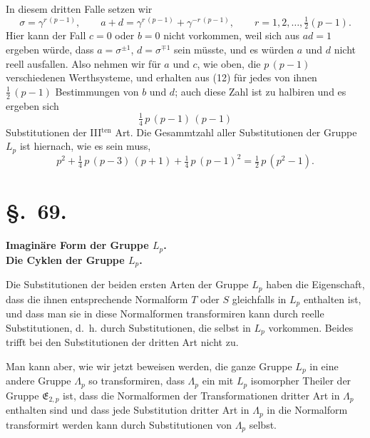 \documentclass[12pt,a4paper]{article}
\newcommand{\sect}[1]{\section*{{\S.~#1.}}\addcontentsline{toc}{section}{\S.~#1}}
\begin{document}
In diesem dritten Falle setzen wir
\begin{equation}\label{eq:68.12}
\tag{12}
\sigma = \gamma^{r\,(p-1)},\qquad
a + d = \gamma^{r\,(p-1)} + \gamma^{-r\,(p-1)},\qquad
r = 1, 2, \ldots, \tfrac{1}{2}(p-1).
\end{equation}
Hier kann der Fall $c = 0$ oder $b = 0$ nicht vorkommen, weil sich aus $ad = 1$ ergeben würde, dass $a = \sigma^{\pm 1}$, $d = \sigma^{\mp 1}$ sein müsste, und es würden $a$ und $d$ nicht reell ausfallen. Also nehmen wir für $a$ und $c$, wie oben, die $p\,(p-1)$ verschiedenen Werthsysteme, und erhalten aus (12) für jedes von ihnen $\frac{1}{2}\,(p-1)$ Bestimmungen von $b$ und $d$; auch diese Zahl ist zu halbiren und es ergeben sich
\[
\tfrac{1}{4}\,p\,(p-1)\,(p-1)
\]
Substitutionen der III$^{\text{ten}}$ Art. Die Gesammtzahl aller Substitutionen der Gruppe $L_{p}$ ist hiernach, wie es sein muss,
\[
p^{2} + \tfrac{1}{4}\,p\,(p-3)\,(p+1) + \tfrac{1}{4}\,p\,(p-1)^{2}
= \tfrac{1}{2}\,p\,(p^{2} - 1).
\]



\newpage
\sect{69}
\begin{center}
\textbf{Imaginäre Form der Gruppe $L_{p}$.\\Die Cyklen der Gruppe $L_{p}$.}
\end{center}
\label{sec:69}

Die Substitutionen der beiden ersten Arten der Gruppe $L_{p}$ haben die Eigenschaft, dass die ihnen entsprechende Normalform $T$ oder $S$ gleichfalls in $L_{p}$ enthalten ist, und dass man sie in diese Normalformen transformiren kann durch reelle Substitutionen, d.~h. durch Substitutionen, die selbst in $L_{p}$ vorkommen. Beides trifft bei den Substitutionen der dritten Art nicht zu.

Man kann aber, wie wir jetzt beweisen werden, die ganze Gruppe $L_{p}$ in eine andere Gruppe $\varLambda_{p}$ so transformiren, dass $\varLambda_{p}$ ein mit $L_{p}$ isomorpher Theiler der Gruppe $\mathfrak{E}_{2,p}$ ist, dass die Normalformen der Transformationen dritter Art in $\varLambda_{p}$ enthalten sind und dass jede Substitution dritter Art in $\varLambda_{p}$ in die Normalform transformirt werden kann durch Substitutionen von $\varLambda_{p}$ selbst.
\end{document}
